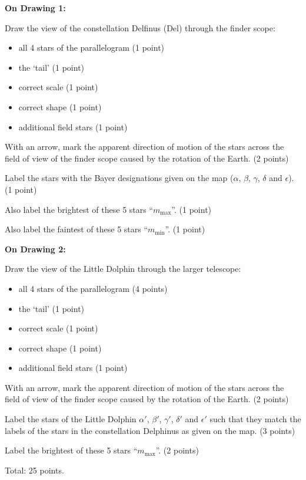 \textbf{On Drawing 1:}

Draw the view of the constellation Delfinus (Del) through the finder
scope: %
\begin{itemize}
\item all 4 stars of the parallelogram \hfill(1 point)
\item the `tail' \hfill(1 point)
\item correct scale \hfill(1 point)
\item correct shape \hfill(1 point)
\item additional field stars \hfill(1 point)
\end{itemize}

With an arrow, mark the apparent direction of motion of the stars across the
field of view of the finder scope caused by the rotation of the Earth.
\hfill(2 points)

Label the stars with the Bayer designations given on the map ($\alpha$,
$\beta$, $\gamma$, $\delta$ and $\epsilon$). \hfill(1 point)

Also label the brightest of these 5 stars ``$m_{\max}$''. \hfill(1 point)

Also label the faintest of these 5 stars ``$m_{\min}$''. \hfill(1 point)

\textbf{On Drawing 2:}

Draw the view of the Little Dolphin through the larger telescope:
\begin{itemize}
\item all 4 stars of the parallelogram \hfill(4 points)
\item the `tail' \hfill(1 point)
\item correct scale \hfill(1 point)
\item correct shape \hfill(1 point)
\item additional field stars \hfill(1 point)
\end{itemize}

With an arrow, mark the apparent direction of motion of the stars across the
field of view of the finder scope caused by the rotation of the Earth.
\hfill(2 points)

Label the stars of the Little Dolphin $\alpha'$, $\beta'$, $\gamma'$,
$\delta'$ and $\epsilon'$ such that they match the labels of the stars in
the constellation Delphinus as given on the map. \hfill(3 points)

Label the brightest of these 5 stars ``$m_{\max}$''. \hfill(2 points)

Total: 25 points.
